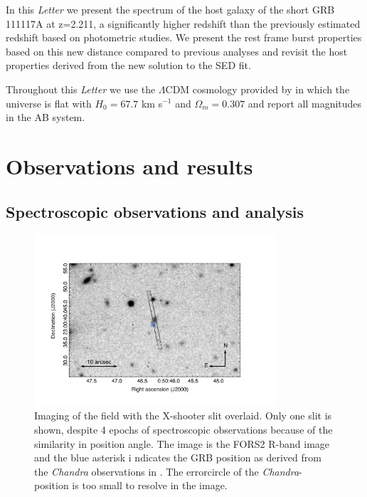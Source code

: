 \documentclass{aa}    %
\begin{document}
In this \emph{Letter} we present the spectrum of the host galaxy of the short GRB 111117A at z=2.211, a significantly higher redshift than the previously estimated redshift based on photometric studies. We present the rest frame burst properties based on this new distance
compared to previous analyses \citep{Margutti2012,Sakamoto2013} and revisit the host properties derived from the new solution to the SED fit. 

Throughout this \emph{Letter} we use the $\Lambda$CDM cosmology provided by
\citet{Planck2015} in which the universe is flat with $H_0 = 67.7$ km s$^{-1}$ and
$\Omega_m = 0.307$ and report all magnitudes in the AB system.


\section{Observations and results}

\subsection{Spectroscopic observations and analysis}

\begin{figure}
	\centering
	\includegraphics[width=9cm]{figures/GRB111117A_spec_obs.pdf}
	\caption{Imaging of the field with the X-shooter slit overlaid. Only one slit is shown, despite 4 epochs of spectroscopic observations because of the similarity in position angle. The image is the FORS2 R-band image and%
	the blue asterisk i ndicates the GRB position as derived from the \emph{Chandra} observations in \citet{Sakamoto2013}. The errorcircle of the \emph{Chandra}-position is too small to resolve in the image.}
	\label{fig:spec_setup}
\end{figure}
\end{document}
